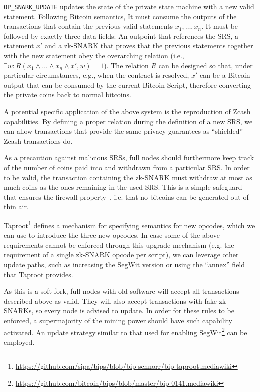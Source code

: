   \texttt{OP\_SNARK\_UPDATE} updates the state of the private state machine with
  a new valid statement. Following Bitcoin semantics, It must consume the
  outputs of the transactions that contain the previous valid statements $x_1,
  \dots, x_n$. It must be followed by exactly three data fields: An outpoint
  that references the SRS, a statement $x'$ and a zk-SNARK that proves that the
  previous statements together with the new statement obey the overarching
  relation (i.e., $\exists w: R(x_1 \wedge \dots \wedge x_n \wedge x', w) = 1$).
  The relation $R$ can be designed so that, under particular circumstances,
  e.g., when the contract is resolved, $x'$ can be a Bitcoin output that can be
  consumed by the current Bitcoin Script, therefore converting the private coins
  back to normal bitcoins.

  A potential specific application of the above system is the reproduction of
  Zcash~\cite{DBLP:conf/sp/Ben-SassonCG0MTV14,zcash-protocol} capabilities. By
  defining a proper relation during the definition of a new SRS, we can allow
  transactions that provide the same privacy guarantees as ``shielded'' Zcash
  transactions do.

  As a precaution against malicious SRSs, full nodes should furthermore keep
  track of the number of coins paid into and withdrawn from a particular SRS. In
  order to be valid, the transaction containing the zk-SNARK must withdraw at
  most as much coins as the ones remaining in the used SRS. This is a simple
  safeguard that ensures the firewall property~\cite{DBLP:conf/sp/GaziKZ19},
  i.e. that no bitcoins can be generated out of thin air.

  Taproot\footnote{\url{https://github.com/sipa/bips/blob/bip-schnorr/bip-taproot.mediawiki}}
  defines a mechanism for specifying semantics for new opcodes, which we can use
  to introduce the three new opcodes. In case some of the above requirements
  cannot be enforced through this upgrade mechanism (e.g. the requirement of a
  single zk-SNARK opcode per script), we can leverage other update paths, such
  as increasing the SegWit version or using the ``annex'' field that Taproot
  provides.

  As this is a soft fork, full nodes with old software will accept all
  transactions described above as valid. They will also accept transactions with
  fake zk-SNARKs, so every node is advised to update. In order for these rules
  to be enforced, a supermajority of the mining power should have such
  capability activated. An update strategy similar to that used for enabling
  SegWit\footnote{\url{https://github.com/bitcoin/bips/blob/master/bip-0141.mediawiki}}
  can be employed.
